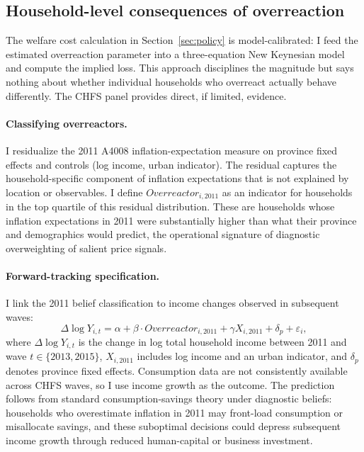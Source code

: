 \subsection{Household-level consequences of overreaction}%

The welfare cost calculation in Section~\ref{sec:policy} is
model-calibrated: I feed the estimated overreaction parameter into a
three-equation New Keynesian model and compute the implied loss. This
approach disciplines the magnitude but says nothing about whether
individual households who overreact actually behave differently. The
CHFS panel provides direct, if limited, evidence.

\paragraph{Classifying overreactors.}
I residualize the 2011 A4008 inflation-expectation measure on province
fixed effects and controls (log income, urban indicator). The residual
captures the household-specific component of inflation expectations
that is not explained by location or observables. I define
$Overreactor_{i,2011}$ as an indicator for households in the top
quartile of this residual distribution. These are households whose
inflation expectations in 2011 were substantially higher than what
their province and demographics would predict, the operational
signature of diagnostic overweighting of salient price signals.

\paragraph{Forward-tracking specification.}
I link the 2011 belief classification to income changes observed in
subsequent waves:
\begin{equation*}%
  \Delta \log Y_{i,t} = \alpha + \beta \cdot Overreactor_{i,2011}
    + \gamma X_{i,2011} + \delta_p + \varepsilon_i,
\end{equation*}
where $\Delta \log Y_{i,t}$ is the change in log total household
income between 2011 and wave $t \in \{2013, 2015\}$, $X_{i,2011}$
includes log income and an urban indicator, and $\delta_p$ denotes
province fixed effects. Consumption data are not consistently
available across CHFS waves, so I use income growth as the outcome.
The prediction follows from standard consumption-savings theory under
diagnostic beliefs: households who overestimate inflation in 2011
may front-load consumption or misallocate savings, and these
suboptimal decisions could depress subsequent income growth through
reduced human-capital or business investment.

